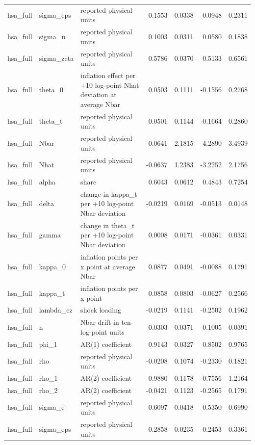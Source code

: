 \begin{tabular}{lllrrrr}
hsa\_full & sigma\_eps & reported physical units & 0.1553 & 0.0338 & 0.0948 & 0.2311 \\
hsa\_full & sigma\_u & reported physical units & 0.1003 & 0.0311 & 0.0580 & 0.1838 \\
hsa\_full & sigma\_zeta & reported physical units & 0.5786 & 0.0370 & 0.5133 & 0.6561 \\
hsa\_full & theta\_0 & inflation effect per +10 log-point Nhat deviation at average Nbar & 0.0503 & 0.1111 & -0.1556 & 0.2768 \\
hsa\_full & theta\_t & reported physical units & 0.0501 & 0.1144 & -0.1664 & 0.2860 \\
hsa\_full & Nbar & reported physical units & 0.0641 & 2.1815 & -4.2890 & 3.4939 \\
hsa\_full & Nhat & reported physical units & -0.0637 & 1.2383 & -3.2252 & 2.1756 \\
hsa\_full & alpha & share & 0.6043 & 0.0612 & 0.4843 & 0.7254 \\
hsa\_full & delta & change in kappa\_t per +10 log-point Nbar deviation & -0.0219 & 0.0169 & -0.0513 & 0.0148 \\
hsa\_full & gamma & change in theta\_t per +10 log-point Nbar deviation & 0.0008 & 0.0171 & -0.0361 & 0.0331 \\
hsa\_full & kappa\_0 & inflation points per x point at average Nbar & 0.0877 & 0.0491 & -0.0088 & 0.1791 \\
hsa\_full & kappa\_t & inflation points per x point & 0.0858 & 0.0803 & -0.0627 & 0.2566 \\
hsa\_full & lambda\_ez & shock loading & -0.0219 & 0.1141 & -0.2502 & 0.1962 \\
hsa\_full & n & Nbar drift in ten-log-point units & -0.0303 & 0.0371 & -0.1005 & 0.0391 \\
hsa\_full & phi\_1 & AR(1) coefficient & 0.9143 & 0.0327 & 0.8502 & 0.9765 \\
hsa\_full & rho & reported physical units & -0.0208 & 0.1074 & -0.2330 & 0.1821 \\
hsa\_full & rho\_1 & AR(2) coefficient & 0.9880 & 0.1178 & 0.7556 & 1.2164 \\
hsa\_full & rho\_2 & AR(2) coefficient & -0.0421 & 0.1123 & -0.2565 & 0.1791 \\
hsa\_full & sigma\_e & reported physical units & 0.6097 & 0.0418 & 0.5350 & 0.6990 \\
hsa\_full & sigma\_eps & reported physical units & 0.2858 & 0.0235 & 0.2453 & 0.3361 \\

\end{tabular}
